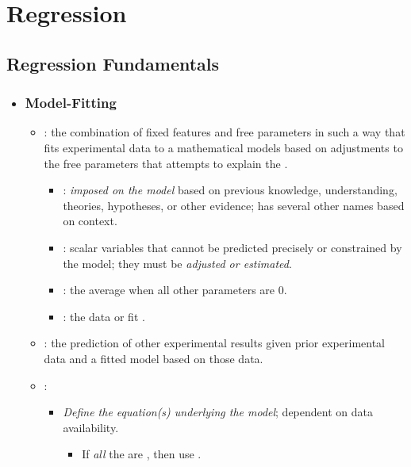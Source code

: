 \chapter{Regression}

\section{Regression Fundamentals}
\begin{itemize}
  \item[]
  
  \subsection{Model-Fitting}
  \begin{itemize}
    \item {}: the combination of fixed features and free parameters in such a way that fits experimental data to a mathematical models based on adjustments to the free parameters that attempts to explain the .
      \begin{itemize}
        \item {}:  \emph{imposed on the model} based on previous knowledge, understanding, theories, hypotheses, or other evidence; has several other names based on context.
        \item {}: scalar variables that cannot be predicted precisely or constrained by the model; they must be \emph{adjusted or estimated}.
        \item {}: the average when all other parameters are 0.
        \item {}: the data  or fit .
      \end{itemize}
    \item {}: the prediction of other experimental results given prior experimental data and a fitted model based on those data.
    \item {}:
    \begin{itemize}
      \item \emph{Define the equation(s) underlying the model}; dependent on data availability. %
        \begin{itemize}
          \item If \emph{all} the  are \hyperref[Subsection: Data Types]{}, then use \hyperref[Chapter: Analysis of Variance]{}.

\end{itemize}
\end{itemize}
\end{itemize}
\end{itemize}
